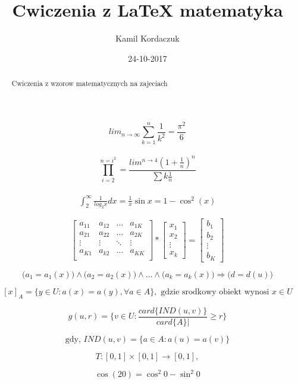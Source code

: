 \documentclass[a4paper,12pt]{article}
\begin{document}
\title{Cwiczenia z LaTeX matematyka}
\author{Kamil Kordaczuk}
\date {24-10-2017}
\maketitle
\begin {abstract} {Cwiczenia z wzorow matematycznych na zajeciach}\end {abstract}

$$lim_{n \to \infty}
\sum_{k=1}^n \frac{1}{k^2}
= \frac{\pi^2}{6}$$\\


$$\prod_{i=2}^{n=i^2} =\frac{lim^{n \to {4}}(1+\frac{1}{n})^n}{\sum k\frac{1}{n}}$$\\


\begin {eqnarray}
\int_{2}^{\infty} \frac{1}{log_{2}x}dx=\frac{1}{x}\sin x=1 - \cos^2(x)
\end {eqnarray}


$$\left[ \begin{array}{cccc}
a_{11} & a_{12} & \ldots & a_{1K}\\
a_{21} & a_{22} & \ldots & a_{2K}\\
\vdots & \vdots & \ddots & \vdots\\
a_{K1} & a_{k2} & \ldots & a_{KK}\\
\end {array} \right] *\left[\begin{array}{c}
x_{1}\\
x_{2}\\
\vdots\\
x_{k}
\end{array} \right]= \left[ \begin {array}{c}
b_{1}\\
b_{2}\\
\vdots\\
b_{K}
\end {array} \right]
$$

$$ \bigl(a_1 = a_1(x) \bigr)\wedge
\bigr(a_2 = a_2(x)\bigl)\wedge\ldots\wedge
\bigl(a_k = a_k(x)\bigr) \Rightarrow \bigl(d = d(u) \bigr)  $$

$$ [x]_A = \{y\in U:a(x) = a(y){,}\forall a \in A\}{,} \textrm {  gdzie srodkowy obiekt wynosi  } x\in U $$



$$ g(u{,}r) = \{ v \in U : \frac{card\{IND(u{,}v)\}}{card\{A\}|} \ge r \} $$

$$ \textrm{gdy, }
IND(u{,}v) = \{a \in A : a(u) = a(v)\} $$

$$ T : [0{,}1] \times [0{,}1] \rightarrow [0{,}1]{,} $$

$$ \cos (20) = \cos^2 0 - \sin^2 0 $$
\end{document}
